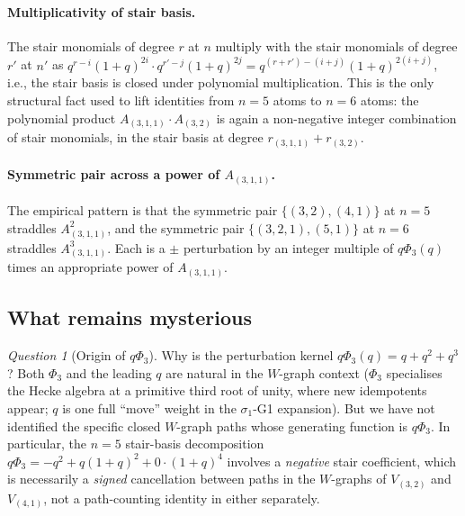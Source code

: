 \documentclass[11pt]{article}
\theoremstyle{plain}
\theoremstyle{definition}
\theoremstyle{remark}
\newtheorem{question}[theorem]{Question}
\newcommand{\PhiThree}{\Phi_3}
\begin{document}
\paragraph{Multiplicativity of stair basis.}
The stair monomials of degree $r$ at $n$ multiply with the stair monomials of
degree $r'$ at $n'$ as $q^{r-i}(1+q)^{2i} \cdot q^{r'-j}(1+q)^{2j} =
q^{(r+r') - (i+j)}(1+q)^{2(i+j)}$, i.e., the stair basis is closed under
polynomial multiplication.  This is the only structural fact used to lift
identities from $n=5$ atoms to $n=6$ atoms: the polynomial product
$A_{(3,1,1)} \cdot A_{(3,2)}$ is again a non-negative integer combination of
stair monomials, in the stair basis at degree $r_{(3,1,1)} + r_{(3,2)}$.

\paragraph{Symmetric pair across a power of $A_{(3,1,1)}$.}
The empirical pattern is that the symmetric pair $\{(3,2), (4,1)\}$ at $n=5$
straddles $A_{(3,1,1)}^2$, and the symmetric pair $\{(3,2,1), (5,1)\}$ at $n=6$
straddles $A_{(3,1,1)}^3$.  Each is a $\pm$ perturbation by an integer multiple
of $q\PhiThree(q)$ times an appropriate power of $A_{(3,1,1)}$.

\subsection{What remains mysterious}

\begin{question}[Origin of $q\PhiThree$]
Why is the perturbation kernel $q\PhiThree(q) = q + q^2 + q^3$?  Both
$\PhiThree$ and the leading $q$ are natural in the $W$-graph context
($\PhiThree$ specialises the Hecke algebra at a primitive third root of unity,
where new idempotents appear; $q$ is one full ``move'' weight in the
$\sigma_1$-G1 expansion).  But we have not identified the specific closed
$W$-graph paths whose generating function is $q\PhiThree$.  In particular, the
$n=5$ stair-basis decomposition $q\PhiThree = -q^2 + q(1+q)^2 + 0\cdot(1+q)^4$
involves a \emph{negative} stair coefficient, which is necessarily a
\emph{signed} cancellation between paths in the $W$-graphs of $V_{(3,2)}$ and
$V_{(4,1)}$, not a path-counting identity in either separately.
\end{question}
\end{document}
